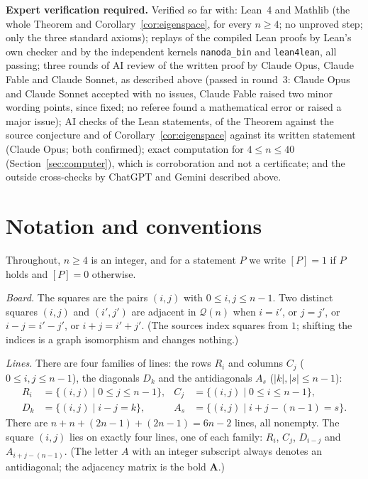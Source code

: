\documentclass[11pt]{amsart}
\theoremstyle{plain}
\theoremstyle{definition}
\theoremstyle{remark}
\numberwithin{equation}{section}
\newcommand{\QG}{\mathcal{Q}}          %
\newcommand{\Adj}{\mathbf{A}}          %
\newcommand{\iv}[1]{[#1]}              %
\newcommand{\abs}[1]{\lvert #1\rvert}
\begin{document}
\textbf{Expert verification required.} Verified so far with: Lean~4 and Mathlib (the
whole Theorem and Corollary~\ref{cor:eigenspace}, for every \(n\ge4\); no unproved step;
only the three standard axioms); replays of the compiled Lean proofs by Lean's own
checker and by the independent kernels \texttt{nanoda\_bin} and \texttt{lean4lean}, all
passing; three rounds of AI review of the written proof by Claude Opus, Claude Fable and
Claude Sonnet, as described above (passed in round~3: Claude Opus and Claude Sonnet
accepted with no issues, Claude Fable raised two minor wording points, since fixed; no
referee found a mathematical error or raised a major issue); AI checks of the Lean
statements, of the Theorem against the source conjecture and of
Corollary~\ref{cor:eigenspace} against its written statement (Claude Opus; both
confirmed); exact computation for
\(4\le n\le40\) (Section~\ref{sec:computer}), which is corroboration and not a
certificate; and the outside cross-checks by ChatGPT and Gemini described above.

\section{Notation and conventions}\label{sec:notation}

Throughout, \(n\ge4\) is an integer, and for a statement \(P\) we write \(\iv{P}=1\) if
\(P\) holds and \(\iv{P}=0\) otherwise.

\emph{Board.} The squares are the pairs \((i,j)\) with \(0\le i,j\le n-1\). Two distinct
squares \((i,j)\) and \((i',j')\) are adjacent in \(\QG(n)\) when \(i=i'\), or \(j=j'\),
or \(i-j=i'-j'\), or \(i+j=i'+j'\). (The sources index squares from \(1\); shifting the
indices is a graph isomorphism and changes nothing.)

\emph{Lines.} There are four families of lines: the rows \(R_i\) and columns \(C_j\)
(\(0\le i,j\le n-1\)), the diagonals \(D_k\) and the antidiagonals \(A_s\)
(\(\abs{k},\abs{s}\le n-1\)):
\begin{align*}
R_i&=\{(i,j)\mid 0\le j\le n-1\}, & C_j&=\{(i,j)\mid 0\le i\le n-1\},\\
D_k&=\{(i,j)\mid i-j=k\}, & A_s&=\{(i,j)\mid i+j-(n-1)=s\}.
\end{align*}
There are \(n+n+(2n-1)+(2n-1)=6n-2\) lines, all nonempty. The square \((i,j)\) lies on
exactly four lines, one of each family: \(R_i\), \(C_j\), \(D_{i-j}\) and
\(A_{i+j-(n-1)}\). (The letter \(A\) with an integer subscript always denotes an
antidiagonal; the adjacency matrix is the bold \(\Adj\).)
\end{document}
